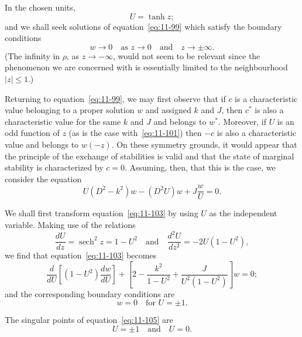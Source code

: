In the chosen units,
\begin{equation}
\label{eq:11-101}
U = \tanh z;
\end{equation}
and we shall seek solutions of equation~\eqref{eq:11-99} which satisfy the boundary conditions
\begin{equation}
\label{eq:11-102}
w \to 0 \quad\text{as } z \to 0 \quad\text{and}\quad z \to \pm\infty.
\end{equation}
(The infinity in $\rho$, as $z \to -\infty$, would not seem to be relevant since the phenomenon we are concerned with is essentially limited to the neighbourhood $|z| \leqslant 1$.)

Returning to equation~\eqref{eq:11-99}, we may first observe that if $c$ is a characteristic value belonging to a proper solution $w$ and assigned $k$ and $J$, then $c^*$ is also a characteristic value for the same $k$ and $J$ and belongs to $w^*$. Moreover, if $U$ is an odd function of $z$ (as is the case with~\eqref{eq:11-101}) then $-c$ is also a characteristic value and belongs to $w(-z)$. On these symmetry grounds, it would appear that the principle of the exchange of stabilities is valid and that the state of marginal stability is characterized by $c = 0$. Assuming, then, that this is the case, we consider the equation
\begin{equation}
\label{eq:11-103}
U(D^2-k^2)w-(D^2U)w+J\frac{w}{U} = 0.
\end{equation}

We shall first transform equation~\eqref{eq:11-103} by using $U$ as the independent variable. Making use of the relations
\begin{equation}
\label{eq:11-104}
\frac{dU}{dz} = \operatorname{sech}^2 z = 1-U^2 \quad\text{and}\quad \frac{d^2U}{dz^2} = -2U(1-U^2),
\end{equation}
we find that equation~\eqref{eq:11-103} becomes
\begin{equation}
\label{eq:11-105}
\frac{d}{dU}\!\left[(1-U^2)\frac{dw}{dU}\right]+\left[2-\frac{k^2}{1-U^2}+\frac{J}{U^2(1-U^2)}\right]w = 0;
\end{equation}
and the corresponding boundary conditions are
\begin{equation}
\label{eq:11-106}
w = 0 \quad\text{for } U = \pm 1.
\end{equation}

The singular points of equation~\eqref{eq:11-105} are
\begin{equation}
\label{eq:11-107}
U = \pm 1 \quad\text{and}\quad U = 0.
\end{equation}

